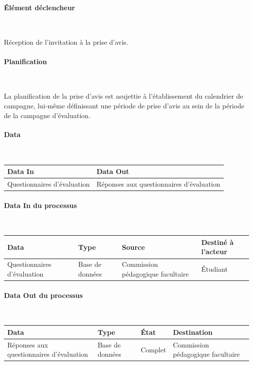 \documentclass[a4paper,11pt]{report}
\begin{document}
\paragraph{Élément déclencheur}~\newline{}

Réception de l'invitation à la prise d'avis.

\paragraph{Planification}~\newline{}

La planification de la prise d'avis est asujettie à l'établissement du calendrier de campagne, lui-même définissant une période de prise d'avis au sein de la période de la campagne d'évaluation.

\paragraph{Data}~\newline{}

\begin{tabularx}{\linewidth}{|X|X|} \hline
Data In & Data Out \\ \hline
Questionnaires d'évaluation & Réponses aux questionnaires d'évaluation\\ \hline
\end{tabularx}

\paragraph{Data In du processus}~\newline{}

\begin{tabularx}{\linewidth}{|X|X|X|X|} \hline
Data & Type & Source & Destiné à l'acteur \\ \hline
Questionnaires d'évaluation & Base de données & Commission pédagogique facultaire & Étudiant \\ \hline
\end{tabularx}

\paragraph{Data Out du processus}~\newline{}

\begin{tabularx}{\linewidth}{|X|X|X|X|} \hline
Data & Type & État & Destination \\ \hline
Réponses aux questionnaires d'évaluation & Base de données & Complet & Commission pédagogique facultaire \\ \hline
\end{tabularx}
\end{document}
